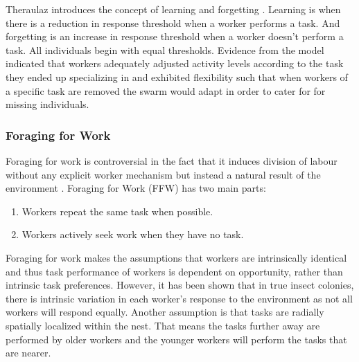 Theraulaz introduces the concept of learning and forgetting \cite{theraulaz1998response}. Learning is when there is a reduction in response threshold when a worker performs a task. And forgetting is an increase in response threshold when a worker doesn't perform a task. All individuals begin with equal thresholds. Evidence from the model indicated that workers adequately adjusted activity levels according to the task they ended up specializing in and exhibited flexibility such that when workers of a specific task are removed the swarm would adapt in order to cater for for missing individuals. 

                                   

\subsubsection{Foraging for Work}

Foraging for work is controversial in the fact that it induces division of labour without any explicit worker mechanism but instead a natural result of the environment \cite{beshers2001models}.  
Foraging for Work (FFW) has two main parts:
\begin{enumerate}
	\item Workers repeat the same task when possible.
	\item Workers actively seek work when they have no task.
\end{enumerate}


Foraging for work makes the assumptions that workers are intrinsically identical and thus task performance of workers is dependent on opportunity, rather than intrinsic task preferences. However, it has been shown that in true insect colonies, there is intrinsic variation in each worker's response to the environment as not all workers will respond equally. Another assumption is that tasks are radially spatially localized within the nest. That means the tasks further away are performed by older workers and the younger workers will perform the tasks that are nearer.


